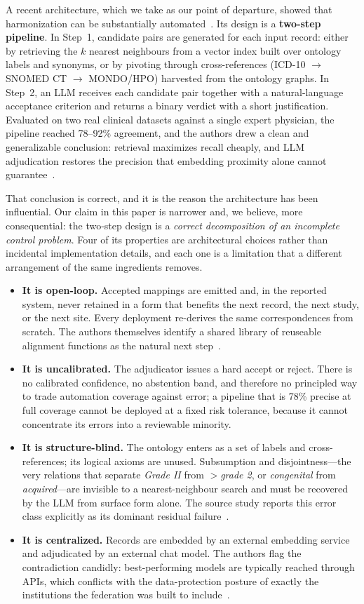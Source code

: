 \documentclass[conference]{IEEEtran}
\begin{document}
A recent architecture, which we take as our point of departure, showed that harmonization can be substantially automated~\cite{b1,b48}. Its design is a \textbf{two-step pipeline}. In Step~1, candidate pairs are generated for each input record: either by retrieving the $k$ nearest neighbours from a vector index built over ontology labels and synonyms, or by pivoting through cross-references (ICD-10 $\rightarrow$ SNOMED CT $\rightarrow$ MONDO/HPO) harvested from the ontology graphs. In Step~2, an LLM receives each candidate pair together with a natural-language acceptance criterion and returns a binary verdict with a short justification. Evaluated on two real clinical datasets against a single expert physician, the pipeline reached 78--92\% agreement, and the authors drew a clean and generalizable conclusion: retrieval maximizes recall cheaply, and LLM adjudication restores the precision that embedding proximity alone cannot guarantee~\cite{b1}.

That conclusion is correct, and it is the reason the architecture has been influential. Our claim in this paper is narrower and, we believe, more consequential: the two-step design is a \emph{correct decomposition of an incomplete control problem}. Four of its properties are architectural choices rather than incidental implementation details, and each one is a limitation that a different arrangement of the same ingredients removes.

\begin{itemize}
\item \textbf{It is open-loop.} Accepted mappings are emitted and, in the reported system, never retained in a form that benefits the next record, the next study, or the next site. Every deployment re-derives the same correspondences from scratch. The authors themselves identify a shared library of reuseable alignment functions as the natural next step~\cite{b1}.
\item \textbf{It is uncalibrated.} The adjudicator issues a hard accept or reject. There is no calibrated confidence, no abstention band, and therefore no principled way to trade automation coverage against error; a pipeline that is 78\% precise at full coverage cannot be deployed at a fixed risk tolerance, because it cannot concentrate its errors into a reviewable minority.
\item \textbf{It is structure-blind.} The ontology enters as a set of labels and cross-references; its logical axioms are unused. Subsumption and disjointness---the very relations that separate \emph{Grade II} from \emph{$>$grade 2}, or \emph{congenital} from \emph{acquired}---are invisible to a nearest-neighbour search and must be recovered by the LLM from surface form alone. The source study reports this error class explicitly as its dominant residual failure~\cite{b1}.
\item \textbf{It is centralized.} Records are embedded by an external embedding service and adjudicated by an external chat model. The authors flag the contradiction candidly: best-performing models are typically reached through APIs, which conflicts with the data-protection posture of exactly the institutions the federation was built to include~\cite{b1,b45}.
\end{itemize}
\end{document}
